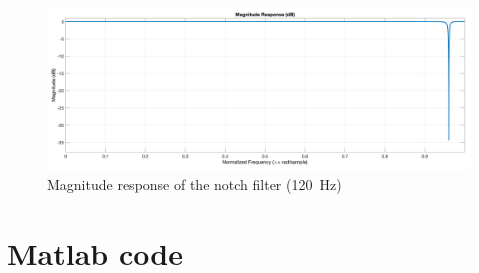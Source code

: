 \documentclass[a4paper, 12pt]{article}
\begin{document}
	\begin{figure}[H]
	    \centering
	    \includegraphics[width=1\textwidth]{resources/pdf/filter_120.pdf}
	    \caption{Magnitude response of the notch filter (\SI{120}{\hertz})}
	    \label{fig:filter_120}
	\end{figure}
	\newpage
	\appendix
	\section{Matlab code}
	
\end{document}
